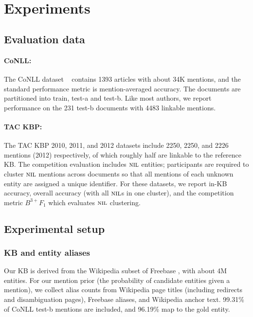 \section{Experiments}
\label{sec:expt}

\subsection{Evaluation data}

\paragraph*{CoNLL:} 
The CoNLL dataset ~\cite{Hoffart2011} contains 1393 articles with
about 34K mentions, and the standard performance metric is
mention-averaged accuracy.  The documents are partitioned into train,
test-a and test-b.  Like most authors, we report performance on the
231 test-b documents with 4483 linkable mentions.

\paragraph*{TAC KBP:} 
The TAC KBP 2010, 2011, and 2012 datasets \cite{TAC2010,TAC2011,TAC2012} include 2250,
2250, and 2226 mentions (2012) respectively,
of which roughly half are linkable
to the reference KB.  The competition evaluation includes $\mbox{\textsc{nil}}$
entities; participants are required to cluster $\mbox{\textsc{nil}}$ mentions across
documents so that all mentions of each unknown entity are assigned a
unique identifier.  For these datasets, we report in-KB accuracy,
overall accuracy (with all $\mbox{\textsc{nil}}$s in one cluster), and the competition
metric $B^{3+} F_1$ which evaluates $\mbox{\textsc{nil}}$ clustering.

\subsection{Experimental setup}

\subsubsection{KB and entity aliases}

Our KB is derived from the Wikipedia subset of Freebase
\cite{BollackerEPST08}, with about 4M entities. For
our mention prior (the probability of candidate entities given a mention), we
collect alias counts from 
Wikipedia page titles (including redirects and disambiguation
pages), Freebase aliases, and Wikipedia anchor text.
99.31\% of CoNLL test-b mentions are included, and 96.19\% map to the gold entity.

